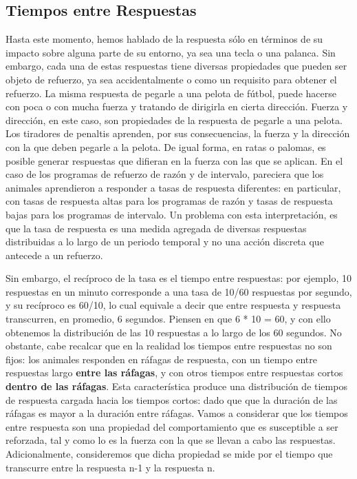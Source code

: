 \documentclass[
  letterpaper,
]{book}
\begin{document}
\subsection{Tiempos entre Respuestas}\label{tiempos-entre-respuestas}

Hasta este momento, hemos hablado de la respuesta sólo en términos de su
impacto sobre alguna parte de su entorno, ya sea una tecla o una
palanca. Sin embargo, cada una de estas respuestas tiene diversas
propiedades que pueden ser objeto de refuerzo, ya sea accidentalmente o
como un requisito para obtener el refuerzo. La misma respuesta de
pegarle a una pelota de fútbol, puede hacerse con poca o con mucha
fuerza y tratando de dirigirla en cierta dirección. Fuerza y dirección,
en este caso, son propiedades de la respuesta de pegarle a una pelota.
Los tiradores de penaltis aprenden, por sus consecuencias, la fuerza y
la dirección con la que deben pegarle a la pelota. De igual forma, en
ratas o palomas, es posible generar respuestas que difieran en la fuerza
con las que se aplican. En el caso de los programas de refuerzo de razón
y de intervalo, pareciera que los animales aprendieron a responder a
tasas de respuesta diferentes: en particular, con tasas de respuesta
altas para los programas de razón y tasas de respuesta bajas para los
programas de intervalo. Un problema con esta interpretación, es que la
tasa de respuesta es una medida agregada de diversas respuestas
distribuidas a lo largo de un periodo temporal y no una acción discreta
que antecede a un refuerzo.

Sin embargo, el recíproco de la tasa es el tiempo entre respuestas: por
ejemplo, 10 respuestas en un minuto corresponde a una tasa de 10/60
respuestas por segundo, y su recíproco es 60/10, lo cual equivale a
decir que entre respuesta y respuesta transcurren, en promedio, 6
segundos. Piensen en que 6 * 10 = 60, y con ello obtenemos la
distribución de las 10 respuestas a lo largo de los 60 segundos. No
obstante, cabe recalcar que en la realidad los tiempos entre respuestas
no son fijos: los animales responden en ráfagas de respuesta, con un
tiempo entre respuestas largo \textbf{entre las ráfagas}, y con otros
tiempos entre respuestas cortos \textbf{dentro de las ráfagas}. Esta
característica produce una distribución de tiempos de respuesta cargada
hacia los tiempos cortos: dado que que la duración de las ráfagas es
mayor a la duración entre ráfagas. Vamos a considerar que los tiempos
entre respuesta son una propiedad del comportamiento que es susceptible
a ser reforzada, tal y como lo es la fuerza con la que se llevan a cabo
las respuestas. Adicionalmente, consideremos que dicha propiedad se mide
por el tiempo que transcurre entre la respuesta n-1 y la respuesta n.
\end{document}
